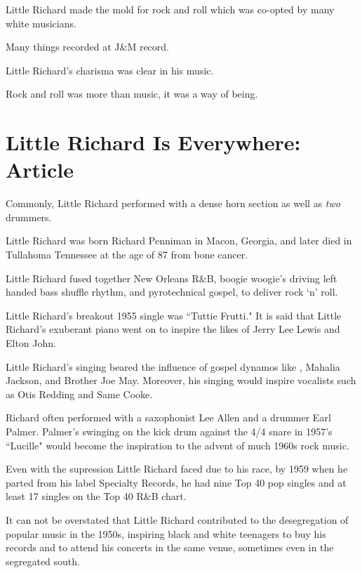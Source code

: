\documentclass[12pt, a4paper, twoside, openright, titlepage]{book}
\begin{document}
\begin{rmk}{}{}
    Little Richard made the mold for rock and roll which was co-opted by many white musicians.
\end{rmk}

Many things recorded at J\&M record.

Little Richard's charisma was clear in his music. 


Rock and roll was more than music, it was a way of being.


\section{Little Richard Is Everywhere: Article}



Commonly, Little Richard performed with a dense horn section as well as \emph{two} drummers.

Little Richard was born Richard Penniman in Macon, Georgia, and later died in Tullahoma Tennessee at the age of 87 from bone cancer. 


\begin{rmk}{}{}
    Little Richard fused together New Orleans R\&B, boogie woogie's driving left handed bass shuffle rhythm, and pyrotechnical gospel, to deliver rock `n' roll.
\end{rmk}

Little Richard's breakout 1955 single was ``Tuttie Frutti." It is said that Little Richard's exuberant piano went on to inspire the likes of Jerry Lee Lewis and Elton John.

Little Richard's singing beared the influence of gospel dynamos like , Mahalia Jackson, and Brother Joe May. Moreover, his singing would inspire vocalists such as Otis Redding and Same Cooke.


Richard often performed with a saxophonist Lee Allen and a drummer Earl Palmer. Palmer's swinging on the kick drum against the 4/4 snare in 1957's ``Lucille" would become the inspiration to the advent of much 1960s rock music.


Even with the supression Little Richard faced due to his race, by 1959 when he parted from his label Specialty Records, he had nine Top 40 pop singles and at least 17 singles on the Top 40 R\&B chart.

\begin{rmk}{}{}
    It can not be overstated that Little Richard contributed to the desegregation of popular music in the 1950s, inspiring black and white teenagers to buy his records and to attend his concerts in the same venue, sometimes even in the segregated south.
\end{rmk}
\end{document}
